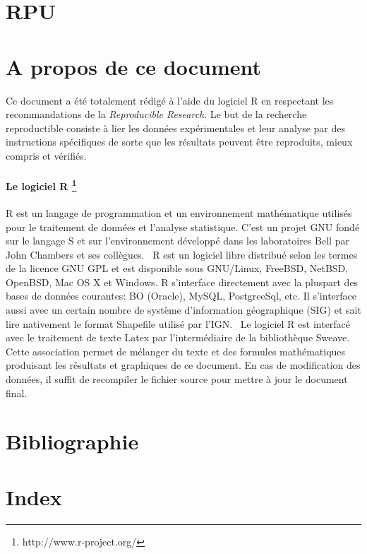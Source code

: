 \documentclass[12pt,english,french,twoside]{report}\usepackage[]{graphicx}\usepackage[]{color}
\begin{document}
\newpage
\chapter{RPU}

\newpage
\chapter{A propos de ce document}


Ce document a été totalement rédigé à l'aide du logiciel R \cite{5} en respectant les recommandations de la \emph{Reproducible Research}. Le but de la recherche reproductible consiste à lier les données expérimentales et leur analyse par des instructions spécifiques de sorte que les résultats peuvent être reproduits, mieux compris et vérifiés.

\subsubsection*{Le logiciel R \footnote{http://www.r-project.org/}}

R est un langage de programmation et un environnement mathématique utilisés pour le traitement de données et l'analyse statistique. C'est un projet GNU fondé sur le langage S et sur l'environnement développé dans les laboratoires Bell par John Chambers et ses collègues. 
\
R est un logiciel libre distribué selon les termes de la licence GNU GPL et est disponible sous GNU/Linux, FreeBSD, NetBSD, OpenBSD, Mac OS X et Windows. R s'interface directement avec la pluspart des bases de données courantes: BO (Oracle), MySQL, PostgreeSql, etc. Il s'interface aussi avec un certain nombre de système d'information géographique (SIG) et sait lire nativement le format Shapefile utilisé par l'IGN.
\
Le logiciel R est interfacé avec le traitement de texte Latex par l'intermédiaire de la bibliothèque Sweave. Cette association permet de mélanger du texte et des formules mathématiques produisant les résultats et graphiques de ce document. En cas de modification des données, il suffit de recompiler le fichier source pour mettre à jour le document final.


\newpage
\chapter{Bibliographie}


\newpage
\chapter{Index}
\printindex
\end{document}
